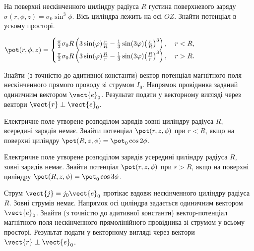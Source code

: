 \begin{problem}
На поверхні нескінченного циліндру радіуса $R$ густина поверхневого заряду  $\sigma(r, \phi, z) = \sigma_0\sin^3\phi$. Вісь циліндра лежить на осі $OZ$. Знайти потенціал в усьому просторі.
\begin{solution}
	$
		\pot(r, \phi, z) =
		\begin{cases}
			\frac{\pi }{2}{\sigma _0}R\left( {3\sin (\varphi )\frac{r}{R} - \frac{1}{3}\sin (3\varphi ){{\left( {\frac{r}{R}} \right)}^3}} \right), \quad r < R , \\
			\frac{\pi }{2}{\sigma _0}R\left( {3\sin (\varphi )\frac{R}{r} - \frac{1}{3}\sin (3\varphi ){{\left( {\frac{R}{r}} \right)}^3}} \right) , \quad r > R .
		\end{cases}
	$
\end{solution}
\end{problem}


\begin{problem}
Знайти (з точністю до адитивної константи) вектор-потенціал магнітного поля  нескінченного прямого проводу зі струмом  $I_0$. Напрямок провідника заданий одиничним вектором $\vect{e}_0$. Результат подати у векторному вигляді через вектори $\vect{r} \perp \vect{e}_0$.
\end{problem}

\begin{problem}
Електричне поле утворене розподілом зарядів зовні циліндру радіуса $R$, всередині зарядів немає. Знайти потенціал $\pot(r,z,\phi)$ при $r<R$, якщо на поверхні циліндру $\pot(R,z,\phi) = \pot_0\cos 2\phi$.
\end{problem}

\begin{problem}
Електричне поле утворене розподілом зарядів усередині циліндру радіуса $R$, зовні зарядів немає. Знайти потенціал $\pot(r,z,\phi)$ при $r>R$, якщо на поверхні циліндру $\pot(R,z,\phi) = \pot_0\cos 3\phi$.
\end{problem}

\begin{problem}
Струм $\vect{j} = j_0\vect{e}_0$ протікає вздовж нескінченного циліндру радіуса $R$. Зовні струмів немає. Напрямок осі циліндра задається одиничним вектором $\vect{e}_0$. Знайти (з точністю до адитивної константи) вектор-потенціал магнітного поля нескінченного прямолінійного провідника зі струмом  у всьому просторі. Результат подати у векторному вигляді через вектори $\vect{r} \perp \vect{e}_0$.
\end{problem}

